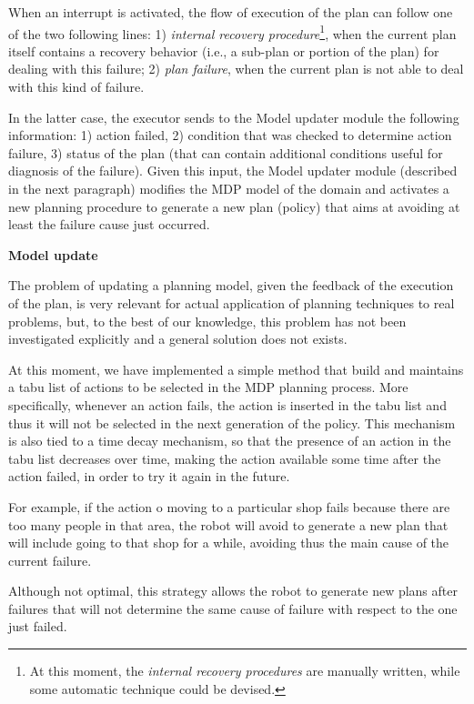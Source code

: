 When an interrupt is activated, the flow of execution of the plan can follow one of the two following lines: 1) \emph{internal recovery procedure}\footnote{At this moment, the \emph{internal recovery procedures} are manually written, while some automatic technique could be devised.}, when the current plan itself contains a recovery behavior (i.e., a sub-plan or portion of the plan) for dealing with this failure; 2) \emph{plan failure}, when the current plan is not able to deal with this kind of failure.

In the latter case, the executor sends to the Model updater module the following information:
1) action failed, 2) condition that was checked to determine action failure, 3) status of the plan (that can contain additional conditions useful for diagnosis of the failure).
Given this input, the Model updater module (described in the next paragraph) modifies the MDP model of the domain and activates a new planning procedure to generate a new plan (policy) that aims at avoiding at least the failure cause just occurred.


\noindent
{\bf Model update}

The problem of updating a planning model, given the feedback of the execution of the plan, is very relevant for actual application of planning techniques to real problems, but, to the best of our knowledge, this problem has not been investigated explicitly and a general solution does not exists.

At this moment, we have implemented a simple method that build and maintains a tabu list of actions to be selected in the MDP planning process.
More specifically, whenever an action fails, the action is inserted in the tabu list and thus it will not be selected in the next generation of the policy.
This mechanism is also tied to a time decay mechanism, so that the presence of an action in the tabu list decreases over time, making the action available some time after the action failed, in order to try it again in the future.

For example, if the action o moving to a particular shop fails because there are too many people in that area, the robot will avoid to generate a new plan that will include going to that shop for a while, avoiding thus the main cause of the current failure.

Although not optimal, this strategy allows the robot to generate new plans after failures that will not determine the same cause of failure with respect to the one just failed. 






